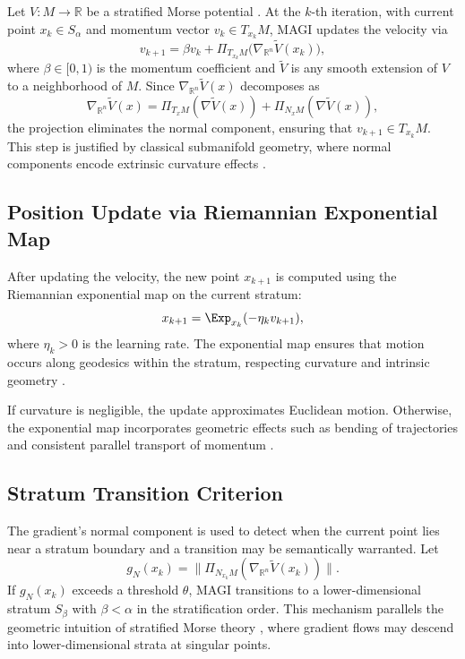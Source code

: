 \documentclass[12pt]{article}
\begin{document}
Let $V : M \to \mathbb{R}$ be a stratified Morse potential \citep{Milnor1963,GoreskyMacPherson1988}. At the $k$-th iteration, with current point $x_k \in S_\alpha$ and momentum vector $v_k \in T_{x_k}M$, MAGI updates the velocity via
\[
v_{k+1}
=
\beta v_k
+
\Pi_{T_{x_k}M}\big( \nabla_{\mathbb{R}^n}\widetilde{V}(x_k) \big),
\]
where $\beta \in [0,1)$ is the momentum coefficient and $\widetilde{V}$ is any smooth extension of $V$ to a neighborhood of $M$. Since $\nabla_{\mathbb{R}^n}\widetilde{V}(x)$ decomposes as
\[
\nabla_{\mathbb{R}^n}\widetilde{V}(x)
=
\Pi_{T_xM}(\nabla\widetilde{V}(x))
+
\Pi_{N_xM}(\nabla\widetilde{V}(x)),
\]
the projection eliminates the normal component, ensuring that $v_{k+1} \in T_{x_k}M$. This step is justified by classical submanifold geometry, where normal components encode extrinsic curvature effects \citep{doCarmoRiemannian1992}.

\subsection*{Position Update via Riemannian Exponential Map}

After updating the velocity, the new point $x_{k+1}$ is computed using the Riemannian exponential map on the current stratum:
\[
x_{k+1} = \Exp_{x_k}(-\eta_k v_{k+1}),
\]
where $\eta_k > 0$ is the learning rate. The exponential map ensures that motion occurs along geodesics within the stratum, respecting curvature and intrinsic geometry \citep{LeeRiemannian2018,CheegerEbin1975}.

If curvature is negligible, the update approximates Euclidean motion. Otherwise, the exponential map incorporates geometric effects such as bending of trajectories and consistent parallel transport of momentum \citep{Jost2011}.

\subsection*{Stratum Transition Criterion}

The gradient’s normal component is used to detect when the current point lies near a stratum boundary and a transition may be semantically warranted. Let
\[
g_N(x_k) = \big\| \Pi_{N_{x_k}M}(\nabla_{\mathbb{R}^n}\widetilde{V}(x_k)) \big\|.
\]
If $g_N(x_k)$ exceeds a threshold $\theta$, MAGI transitions to a lower-dimensional stratum $S_\beta$ with $\beta < \alpha$ in the stratification order. This mechanism parallels the geometric intuition of stratified Morse theory \citep{GoreskyMacPherson1988}, where gradient flows may descend into lower-dimensional strata at singular points.
\end{document}
